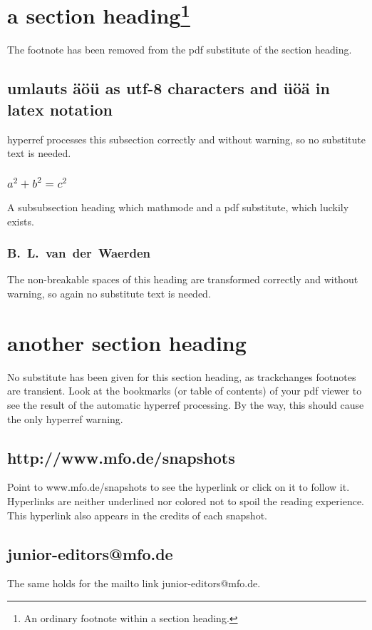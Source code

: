 \documentclass{snapshotmfo}
\begin{document}
\section[abbr. section heading]{a section heading\footnote{An ordinary footnote within a section heading.}
}
The footnote has been removed from the pdf substitute of the section heading.

\subsection{umlauts äöü as utf-8 characters and \"u\"o\"a in latex notation}
hyperref processes this subsection correctly and without warning, so no substitute text is needed. 

\subsubsection[a²+b²=c²]{$a^2 + b^2 = c^2$}
A subsubsection heading which mathmode and a pdf substitute, which luckily exists.

\subsubsection{B.~L.~van~der~Waerden}
The non-breakable spaces of this heading are transformed correctly and without warning, so again no substitute text is needed.

\section{another section heading}
No substitute has been given for this section heading, as trackchanges footnotes are transient.
Look at the bookmarks (or table of contents) of your pdf viewer to see the result of the automatic hyperref processing.
By the way, this should cause the only hyperref warning.

\subsection{http://www.mfo.de/snapshots}
Point to www.mfo.de/snapshots to see the hyperlink or click on it to follow it. Hyperlinks are neither underlined nor colored not to spoil the reading experience. This hyperlink also appears in the credits of each snapshot.

\subsection{junior-editors@mfo.de}
The same holds for the mailto link junior-editors@mfo.de.
\end{document}

